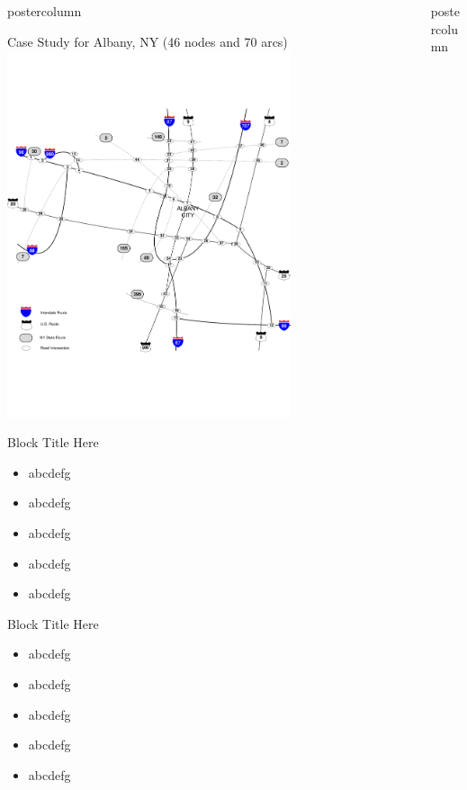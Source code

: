 \documentclass[final]{beamer}
\newlength{\columnheight}
\begin{document}
\begin{frame}
\begin{columns}
\begin{column}{0.32\textwidth}
\begin{beamercolorbox}[center,wd=\textwidth]{postercolumn}
\begin{minipage}[T]{.95\textwidth}
{  \begin{block}{Case Study for Albany, NY (46 nodes and 70 arcs)}
    \includegraphics[width=0.7\textwidth]{map_albany}
  \end{block}


  \begin{block}{Block Title Here}
  	\begin{itemize}
  	\item abcdefg
  	\item abcdefg
  	\item abcdefg
  	\item abcdefg
  	\item abcdefg
  	\end{itemize}
  \end{block}
  
  \begin{block}{Block Title Here}
  	\begin{itemize}
  	\item abcdefg
  	\item abcdefg
  	\item abcdefg
  	\item abcdefg
  	\item abcdefg
  	\end{itemize}
  \end{block}



}
\end{minipage}
\end{beamercolorbox}
\end{column}
\begin{column}{0.32\textwidth}
\begin{beamercolorbox}[center,wd=\textwidth]{postercolumn}
\begin{minipage}[T]{.95\textwidth}
\parbox[t][\columnheight]{\textwidth}{


}
\end{minipage}
\end{beamercolorbox}
\end{column}
\end{columns}
\end{frame}
\end{document}
